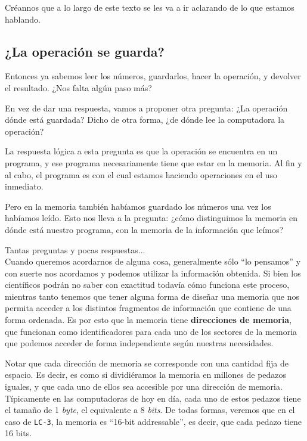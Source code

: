 \documentclass[a4paper, titlepage]{report}
\begin{document}
	Créannos que a lo largo de este texto se les va a ir aclarando de lo que estamos hablando.
	
	\subsection{¿La operación se guarda?}
	
	Entonces ya sabemos leer los números, guardarlos, hacer la operación, y devolver el resultado. ¿Nos falta algún paso más?
	
	En vez de dar una respuesta, vamos a proponer otra pregunta: ¿La operación dónde está guardada? Dicho de otra forma, ¿de dónde lee la computadora la operación?
	
	La respuesta lógica a esta pregunta es que la operación se encuentra en un programa, y ese programa necesariamente tiene que estar en la memoria. Al fin y al cabo, el programa es con el cual estamos haciendo operaciones en el uso inmediato.
	
	Pero en la memoria también habíamos guardado los números una vez los habíamos leído. Esto nos lleva a la pregunta: ¿cómo distinguimos la memoria en dónde está nuestro programa, con la memoria de la información que leímos?
	
	Tantas preguntas y pocas respuestas...\\
	
	Cuando queremos acordarnos de alguna cosa, generalmente sólo ``lo pensamos'' y con suerte nos acordamos y podemos utilizar la información obtenida. Si bien los científicos podrán no saber con exactitud todavía cómo funciona este proceso, mientras tanto tenemos que tener alguna forma de diseñar una memoria que nos permita acceder a los distintos fragmentos de información que contiene de una forma ordenada. Es por esto que la memoria tiene \textbf{direcciones de memoria}, que funcionan como identificadores para cada uno de los sectores de la memoria que podemos acceder de forma independiente según nuestras necesidades. 
	
	Notar que cada dirección de memoria se corresponde con una cantidad fija de espacio. Es decir, es como si dividiéramos la memoria en millones de pedazos iguales, y que cada uno de ellos sea accesible por una dirección de memoria. Típicamente en las computadoras de hoy en día, cada uno de estos pedazos tiene el tamaño de 1 \textit{byte}, el equivalente a 8 \textit{bits}. De todas formas, veremos que en el caso de \texttt{LC-3}, la memoria es ``16-bit addressable'', es decir, que cada pedazo tiene 16 bits.
		
\end{document}
